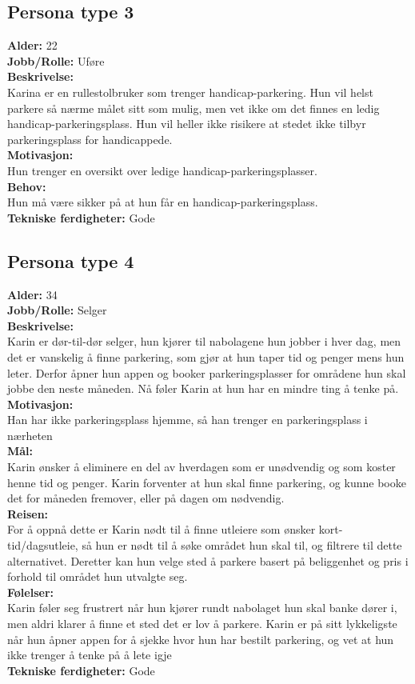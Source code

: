 \documentclass[12pt]{article}
\begin{document}
    \subsection{Persona type 3}
    \textbf{Alder:} 22\\\textbf{Jobb/Rolle:} Uføre\\\textbf{Beskrivelse:}\\Karina er en rullestolbruker som trenger handicap-parkering. Hun vil helst parkere så nærme målet sitt som mulig, men vet ikke om det finnes en ledig handicap-parkeringsplass. Hun vil heller ikke risikere at stedet ikke tilbyr parkeringsplass for handicappede.\\\textbf{Motivasjon:}\\Hun trenger en oversikt over ledige handicap-parkeringsplasser.\\\textbf{Behov:}\\Hun må være sikker på at hun får en handicap-parkeringsplass.\\\textbf{Tekniske ferdigheter:} Gode

    \subsection{Persona type 4}
    \textbf{Alder:} 34 \\\textbf{Jobb/Rolle:} Selger\\\textbf{Beskrivelse:}\\Karin er dør-til-dør selger, hun kjører til nabolagene hun jobber i hver dag, men det er vanskelig å finne parkering, som gjør at hun taper tid og penger mens hun leter. Derfor åpner hun appen og booker parkeringsplasser for områdene hun skal jobbe den neste måneden. Nå føler Karin at hun har en mindre ting å tenke på.\\\textbf{Motivasjon:}\\Han har ikke parkeringsplass hjemme, så han trenger en parkeringsplass i nærheten\\\textbf{Mål:}\\Karin ønsker å eliminere en del av hverdagen som er unødvendig og som koster henne tid og penger. Karin forventer at hun skal finne parkering, og kunne booke det for måneden fremover, eller på dagen om nødvendig.\\\textbf{Reisen:}\\For å oppnå dette er Karin nødt til å finne utleiere som ønsker kort-tid/dagsutleie, så hun er nødt til å søke området hun skal til, og filtrere til dette alternativet. Deretter kan hun velge sted å parkere basert på beliggenhet og pris i forhold til området hun utvalgte seg.\\\textbf{Følelser:}\\Karin føler seg frustrert når hun kjører rundt nabolaget hun skal banke dører i, men aldri klarer å finne et sted det er lov å parkere. Karin er på sitt lykkeligste når hun åpner appen for å sjekke hvor hun har bestilt parkering, og vet at hun ikke trenger å tenke på å lete igje\\\textbf{Tekniske ferdigheter:} Gode
\end{document}

